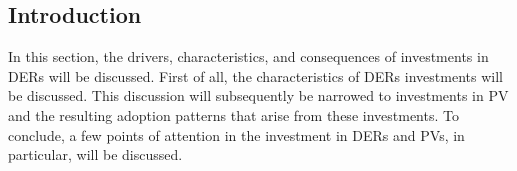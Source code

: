 \subsection{Introduction}
In this section, the drivers, characteristics, and consequences of investments in DERs will be discussed. First of all, the characteristics of DERs investments will be discussed. This discussion will subsequently be narrowed to investments in PV and the resulting adoption patterns that arise from these investments. To conclude, a few points of attention in the investment in DERs and PVs, in particular, will be discussed.
